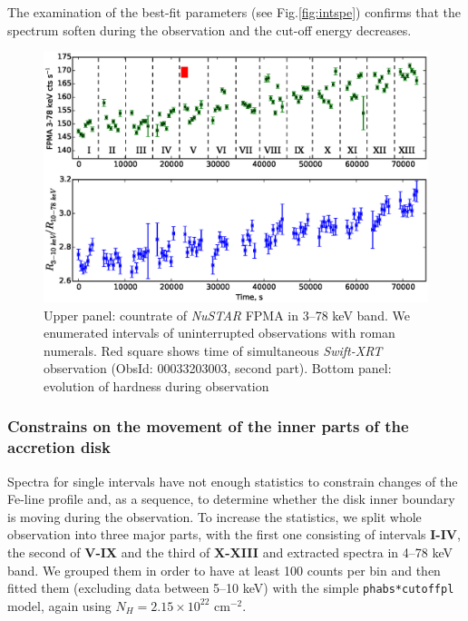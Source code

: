 \documentclass[a4paper,fleqn,usenatbib]{mnras}
\def\swiftx{{\em Swift-XRT\,}}
\def\nustar{{\em NuSTAR\,}}
\begin{document}
The examination of the best-fit parameters (see Fig.\ref{fig:intspe}) confirms that the spectrum soften during the observation and the cut-off energy decreases. 

\begin{figure}
\centerline{\includegraphics[scale=0.7]{nuAlc_color_v04.eps}}
\caption{Upper panel: countrate of \nustar\,FPMA in 3--78 keV band. We enumerated intervals of uninterrupted observations with roman numerals. Red square shows time of simultaneous \swiftx observation (ObsId: 00033203003, second part). Bottom panel: evolution of hardness during observation} 
\label{fig:nust_lc}
\end{figure} 


\subsubsection{Constrains on the movement of the inner parts of the accretion disk}
\label{sec:disk_constr}
Spectra for single intervals have not enough statistics to constrain changes of the Fe-line profile and, as a sequence, to determine whether the disk inner boundary  is moving during the observation. 
To increase the statistics, we split whole observation into three major parts, with the first one consisting of intervals {\bf I-IV}, the second of {\bf V-IX} and the third of {\bf X-XIII} and extracted spectra in 4--78 keV band. 
We grouped them in order to have at least 100 counts per bin and then fitted them (excluding data between 5--10 keV) with the simple \texttt{phabs*cutoffpl} model, again using $N_{H} = 2.15\times10^{22}$ cm$^{-2}$.  
\end{document}
